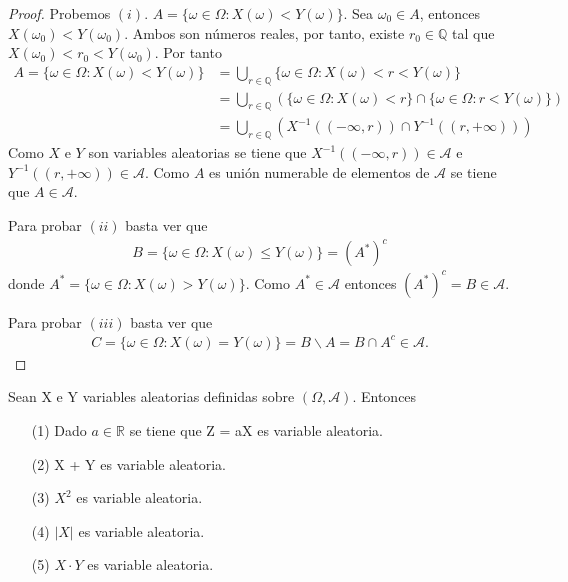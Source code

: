 \begin{proof}
    Probemos $(i)$. $A = \{ \omega \in \Omega : X(\omega) < Y(\omega) \}$. Sea $\omega_0 \in A$, entonces $X(\omega_0) < Y(\omega_0)$. Ambos son números reales, por tanto, existe $r_0 \in \mathbb{Q}$ tal que $X(\omega_0) < r_0 < Y(\omega_0)$. Por tanto
    \begin{align*}
        A = \{ \omega \in \Omega : X(\omega) < Y(\omega) \} & = \bigcup_{r \in \mathbb{Q}}{\{ \omega \in \Omega : X(\omega) < r < Y(\omega) \}}                                                \\
                                                            & = \bigcup_{r \in \mathbb{Q}}{\left(\{ \omega \in \Omega : X(\omega) < r \} \cap \{ \omega \in \Omega :  r < Y(\omega) \}\right)} \\
                                                            & = \bigcup_{r \in \mathbb{Q}}{\left( X^{-1}((-\infty, r)) \cap Y^{-1}((r,+\infty))\right)}
    \end{align*}
    Como $X$ e $Y$ son variables aleatorias se tiene que $ X^{-1}((-\infty, r)) \in \mathcal{A}$ e $Y^{-1}((r,+\infty)) \in \mathcal{A}$. Como $A$ es unión numerable de elementos de $\mathcal{A}$ se tiene que $A \in \mathcal{A}$.

    Para probar $(ii)$ basta ver que
    \begin{align*}
        B = \{ \omega \in \Omega : X(\omega) \leq Y(\omega) \} = (A^*)^c
    \end{align*}
    donde $A^* = \{ \omega \in \Omega : X(\omega) > Y(\omega) \}$. Como $A^* \in \mathcal{A}$ entonces $(A^*)^c = B \in \mathcal{A}$.

    Para probar $(iii)$ basta ver que
    \begin{align*}
        C = \{ \omega \in \Omega : X(\omega) = Y(\omega) \} = B \backslash A = B \cap A^c \in \mathcal{A}.
    \end{align*}
\end{proof}

\begin{prop}
    Sean X e Y variables aleatorias definidas sobre $(\Omega, \mathcal{A})$. Entonces
    \begin{enumerate}
        \item[(1)] Dado $a \in \mathbb{R}$ se tiene que Z = aX es variable aleatoria.
        \item[(2)] X + Y es variable aleatoria.
        \item[(3)] $X^2$ es variable aleatoria.
        \item[(4)] $|X|$ es variable aleatoria.
        \item[(5)] $X \cdot Y$ es variable aleatoria.
    \end{enumerate}
\end{prop}

